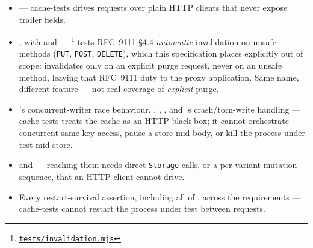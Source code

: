\begin{itemize}
    \item {} --- cache-tests drives requests
          over plain HTTP clients that never expose trailer fields.
    \item {}, with
           and
           ---
          \footnote{\href{https://github.com/http-tests/cache-tests/blob/b55b8bda3dbb8c927c04e85bd8d496a8caa3e4ba/tests/invalidation.mjs}{\texttt{tests/invalidation.mjs}}}
          tests RFC~9111 \S4.4 \emph{automatic} invalidation on unsafe
          methods (\texttt{PUT}, \texttt{POST}, \texttt{DELETE}), which this
          specification places explicitly out of scope: 
          invalidates only on an explicit purge request, never on an unsafe
          method, leaving that RFC~9111 duty to the proxy application. Same
          name, different feature --- not real coverage of \emph{explicit}
          purge.
    \item {}'s concurrent-writer race
          behaviour, ,
          ,
          , and
          's crash/torn-write handling
          --- cache-tests treats the cache as an HTTP black box; it cannot
          orchestrate concurrent same-key access, pause a store mid-body, or
          kill the process under test mid-store.
    \item {} and
           --- reaching them needs
          direct \texttt{Storage} calls, or a per-variant mutation sequence,
          that an HTTP client cannot drive.
    \item Every restart-survival assertion, including all of
          , across the
           requirements --- cache-tests cannot
          restart the process under test between requests.
\end{itemize}
\endgroup

